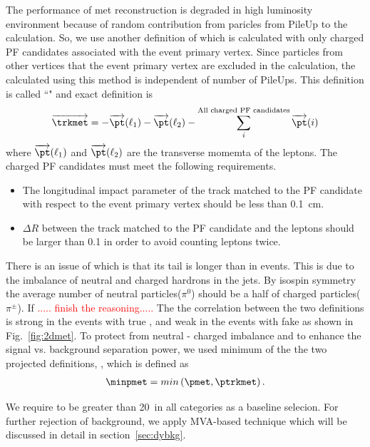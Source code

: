 The performance of met reconstruction is degraded in high luminosity environment 
because of random contribution from paricles from PileUp to the \met{} calculation. 
So, we use another definition of \met{} which is calculated with only charged 
PF candidates associated with the event primary vertex. Since particles from 
other vertices that the event primary vertex are excluded in the \met{} calculation,
the \met{} calculated using this method is independent of number of PileUps.  
This \met{} definition is called ``\trkmet" and exact definition is
\begin{eqnarray} 
\overrightarrow{\trkmet} 
= 
- \overrightarrow{\pt} (\ell_1)  
- \overrightarrow{\pt} (\ell_2)  
- \sum^{\textrm{All charged PF candidates}}_i \overrightarrow{\pt}(i)
\end{eqnarray} 
where $\overrightarrow{\pt} (\ell_1)$ and $\overrightarrow{\pt} (\ell_2)$
are the transverse momemta of the leptons. The charged PF candidates must 
meet the following requirements.
\begin{itemize}
\item The longitudinal impact parameter of the track matched to the PF candidate 
      with respect to the event primary vertex should be less than 0.1~cm. 
\item $\Delta R$ between the track matched to the PF candidate and the leptons 
      should be larger than 0.1 in order to avoid counting leptons twice. 
\end{itemize}
There is an issue of \trkmet{} which is that its tail is longer than \pfmet 
in \dyll{} events. This is due to the imbalance of neutral and charged hardrons 
in the jets. By isospin symmetry the average number of neutral particles($\pi^0$) should 
be a half of charged particles($\pi^\pm$). If \textcolor{red}{..... finish the reasoning.....}  
The the correlation between the two definitions is strong in the events with 
true \met, and weak in the events with fake \met{} as shown in Fig.~\ref{fig:2dmet}. 
To protect from neutral - charged imbalance and to enhance the signal vs. background 
separation power, we used minimum of the the two projected \met{} definitions, 
\minpmet, which is defined as 
\begin{eqnarray} 
\minpmet = min \left( \pmet, \ptrkmet \right). 
\end{eqnarray} 

We require \minpmet{} to be greater than 20~\GeV in all categories as a baseline selecion. 
For further rejection of \dyll{} background, we apply MVA-based technique which will be 
discussed in detail in section~\ref{sec:dybkg}. 

